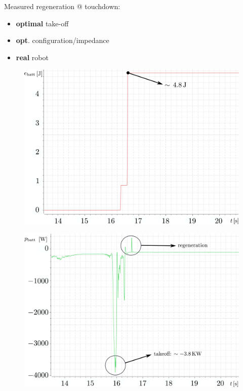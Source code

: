 \documentclass[aspectratio=169]{beamer}
\begin{document}
\begin{frame}
Measured regeneration @ touchdown:
\begin{itemize}
\item \textbf{optimal} take-off
\item \textbf{opt}. configuration/impedance
\item \textbf{real} robot
\end{itemize}
\begin{multicols}{2}
\begin{figure}
    \includegraphics[width=1.0\columnwidth]{beamer_imgs/reg_energy.pdf}
\end{figure}
\columnbreak
\begin{figure}
\includegraphics[width=1.0\columnwidth]{beamer_imgs/reg_pow.pdf}
\end{figure}
\end{multicols}
\end{frame}
\end{document}
